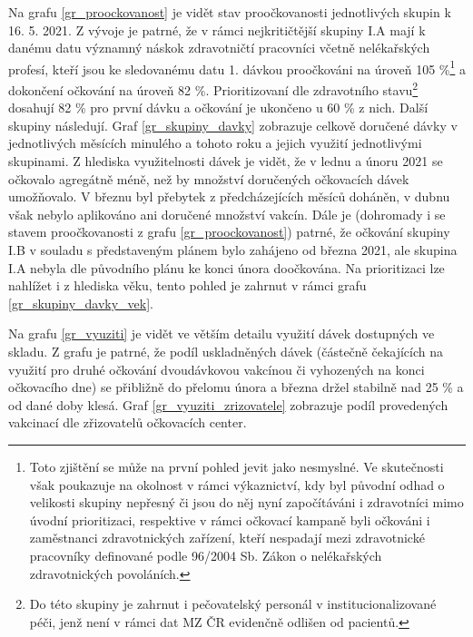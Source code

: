 Na grafu \ref{gr_proockovanost} je vidět stav proočkovanosti jednotlivých skupin k 16. 5. 2021. Z vývoje je patrné, že v rámci nejkritičtější skupiny I.A mají k danému datu významný náskok zdravotničtí pracovníci včetně nelékařských profesí, kteří jsou ke sledovanému datu 1. dávkou proočkováni na úroveň 105 \%\footnote{Toto zjištění se může na první pohled jevit jako nesmyslné. Ve skutečnosti však poukazuje na okolnost v rámci výkaznictví, kdy byl původní odhad o velikosti skupiny nepřesný či jsou do něj nyní započítáváni i zdravotníci mimo úvodní prioritizaci, respektive v rámci očkovací kampaně byli očkováni i zaměstnanci zdravotnických zařízení, kteří nespadají mezi zdravotnické pracovníky definované podle 96/2004 Sb. Zákon o nelékařských zdravotnických povoláních.} a dokončení očkování na úroveň 82 \%. Prioritizovaní dle zdravotního stavu\footnote{Do této skupiny je zahrnut i pečovatelský personál v institucionalizované péči, jenž není v rámci dat MZ ČR evidenčně odlišen od pacientů.} dosahují 82 \% pro první dávku a očkování je ukončeno u 60 \% z nich. Další skupiny následují. 
%
Graf \ref{gr_skupiny_davky} zobrazuje celkově doručené dávky v jednotlivých měsících minulého a tohoto roku a jejich využití jednotlivými skupinami. Z hlediska využitelnosti dávek je vidět, že v lednu a únoru 2021 se očkovalo agregátně méně, než by množství doručených očkovacích dávek umožňovalo. V březnu byl přebytek z předcházejících měsíců doháněn, v dubnu však nebylo aplikováno ani doručené množství vakcín. Dále je (dohromady i se stavem proočkovanosti z grafu \ref{gr_proockovanost}) patrné, že očkování skupiny I.B v souladu s představeným plánem bylo zahájeno od března 2021, ale skupina I.A nebyla dle původního plánu ke konci února doočkována.
%
Na prioritizaci lze nahlížet i z hlediska věku, tento pohled je zahrnut v rámci grafu \ref{gr_skupiny_davky_vek}.


Na grafu \ref{gr_vyuziti} je vidět ve větším detailu využití dávek dostupných ve skladu. Z grafu je patrné, že podíl uskladněných dávek (částečně čekajících na využití pro druhé očkování dvoudávkovou vakcínou či vyhozených na konci očkovacího dne) se přibližně do přelomu února a března držel stabilně nad 25 \% a od dané doby klesá.
%
Graf \ref{gr_vyuziti_zrizovatele} zobrazuje podíl provedených vakcinací dle zřizovatelů očkovacích center.






